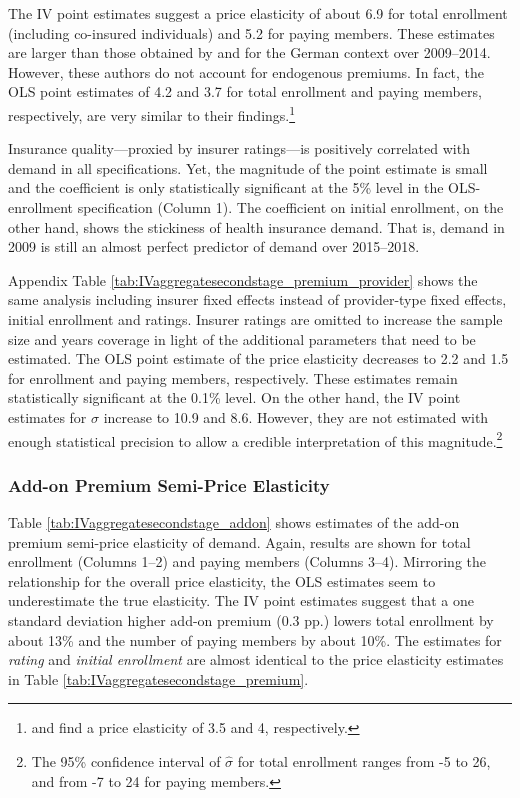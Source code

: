 \documentclass[a4paper, 11pt, english]{article}
\begin{document}
The IV point estimates suggest a price elasticity of about 6.9 for total enrollment (including co-insured individuals) and 5.2 for paying members. These estimates are larger than those obtained by \citet{Pendzialek2015} and \citet{Schmitz2017} for the German context over 2009--2014. However, these authors do not account for endogenous premiums. In fact, the OLS point estimates of 4.2 and 3.7 for total enrollment and paying members, respectively, are very similar to their findings.\footnote{\citet{Pendzialek2015} and \citet{Schmitz2017} find a price elasticity of 3.5 and 4, respectively.}

Insurance quality---proxied by insurer ratings---is positively correlated with demand in all specifications. Yet, the magnitude of the point estimate is small and the coefficient is only statistically significant at the 5\% level in the OLS-enrollment specification (Column 1). The coefficient on initial enrollment, on the other hand, shows the stickiness of health insurance demand. That is, demand in 2009 is still an almost perfect predictor of demand over 2015--2018.

Appendix Table \ref{tab:IVaggregatesecondstage_premium_provider} shows the same analysis including insurer fixed effects instead of provider-type fixed effects, initial enrollment and ratings. Insurer ratings are omitted to increase the sample size and years coverage in light of the additional parameters that need to be estimated. The OLS point estimate of the price elasticity decreases to 2.2 and 1.5 for enrollment and paying members, respectively. These estimates remain statistically significant at the 0.1\% level. On the other hand, the IV point estimates for $\sigma$ increase to 10.9 and 8.6. However, they are not estimated with enough statistical precision to allow a credible interpretation of this magnitude.\footnote{The 95\% confidence interval of $\hat{\sigma}$ for total enrollment ranges from -5 to 26, and from -7 to 24 for paying members.}

\subsubsection*{Add-on Premium Semi-Price Elasticity}

Table \ref{tab:IVaggregatesecondstage_addon} shows estimates of the add-on premium semi-price elasticity of demand. Again, results are shown for total enrollment (Columns 1--2) and paying members (Columns 3--4). Mirroring the relationship for the overall price elasticity, the OLS estimates seem to underestimate the true elasticity. The IV point estimates suggest that a one standard deviation higher add-on premium (0.3 pp.) lowers total enrollment by about 13\% and the number of paying members by about 10\%. The estimates for \textit{rating} and \textit{initial enrollment} are almost identical to the price elasticity estimates in Table \ref{tab:IVaggregatesecondstage_premium}.
\end{document}
